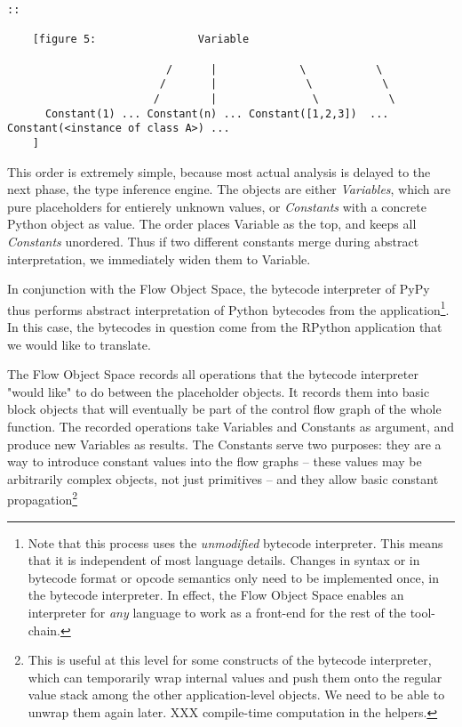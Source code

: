 \documentclass{acm_proc_article-sp}
\begin{document}
\begin{verbatim}
::

    [figure 5:                Variable

                         /      |             \           \
                        /       |              \           \
                       /        |               \           \
      Constant(1) ... Constant(n) ... Constant([1,2,3])  ... Constant(<instance of class A>) ...
    ]
\end{verbatim}

This order is extremely simple, because most actual analysis is delayed
to the next phase, the type inference engine.  The objects are either
\textit{Variables}, which are pure placeholders for entierely unknown values,
or \textit{Constants} with a concrete Python object as value.  The order places
Variable as the top, and keeps all \textit{Constants} unordered.  Thus if two
different constants merge during abstract interpretation, we immediately
widen them to Variable.

In conjunction with the Flow Object Space, the bytecode interpreter of
PyPy thus performs abstract interpretation of Python bytecodes from
the application\footnote{Note that this process uses the
\textit{unmodified} bytecode interpreter.  This means that it is
independent of most language details.  Changes in syntax or in
bytecode format or opcode semantics only need to be implemented once,
in the bytecode interpreter.  In effect, the Flow Object Space enables
an interpreter for \textit{any} language to work as a front-end for
the rest of the tool-chain.}.  In this case, the bytecodes in
question come from the RPython application that we would like to
translate.

The Flow Object Space records all operations that the bytecode
interpreter "would like" to do between the placeholder objects.  It
records them into basic block objects that will eventually be part of
the control flow graph of the whole function.  The recorded operations
take Variables and Constants as argument, and produce new Variables as
results.  The Constants serve two purposes: they are a way to
introduce constant values into the flow graphs -- these values may be
arbitrarily complex objects, not just primitives -- and they allow
basic constant propagation\footnote{This is useful at this level for
some constructs of the bytecode interpreter, which can temporarily
wrap internal values and push them onto the regular value stack among
the other application-level objects.  We need to be able to unwrap
them again later. XXX compile-time computation in the helpers.}
\end{document}
